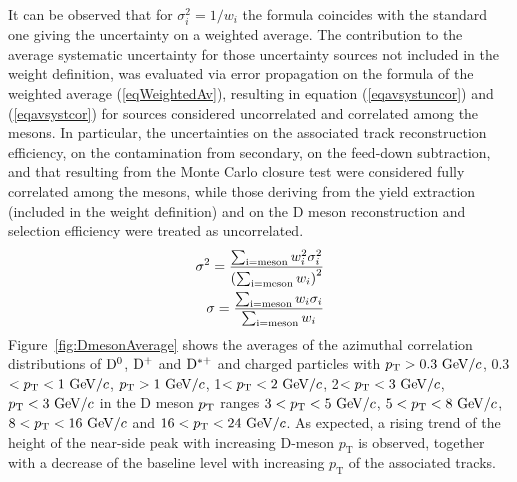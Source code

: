 It can be observed that for $\sigma^{2}_{i}=1/w_{i}$ the formula coincides with the standard one giving the uncertainty on a weighted average.
The contribution to the average systematic uncertainty for those uncertainty sources
not included in the weight definition, was evaluated via error propagation on the formula of
the weighted average (\ref{eqWeightedAv}), resulting in equation (\ref{eqavsystuncor}) and (\ref{eqavsystcor}) for sources
considered uncorrelated and correlated among the mesons. In particular, the uncertainties on the associated track reconstruction efficiency, on the
contamination from secondary, on the feed-down subtraction, and that resulting from the Monte Carlo closure test were considered fully correlated among
the mesons, while those deriving from the yield extraction (included in the weight definition) and on the D meson reconstruction and selection efficiency were treated as uncorrelated.
\begin{eqnarray}
  \sigma^{2}=\frac{\sum_{\rm i=meson}w_{i}^{2}\sigma^{2}_{i}}{\left( \sum_{\rm i=meson}w_{i}\right)^{2}}  \label{eqavsystuncor}\\
  \sigma=\frac{\sum_{\rm i=meson}w_{i}\sigma_{i}}{ \sum_{\rm i=meson}w_{i}}   \label{eqavsystcor}
\end{eqnarray}
Figure~\ref{fig:DmesonAverage} shows the averages of the azimuthal correlation distributions of ${\rm D^0}$, ${\rm D^+}$ and ${\rm D^{*+}}$ and charged particles with $p_{\rm T}>0.3~\mathrm{GeV}/c$, 0.3$<p_{\rm T}<1~\mathrm{GeV}/c$, $p_{\rm T}>1~\mathrm{GeV}/c$, 1$<p_{\rm T}<2~\mathrm{GeV}/c$, 2$<p_{\rm T}<3~\mathrm{GeV}/c$, $p_{\rm T}<3~\mathrm{GeV}/c$ in the D meson $p_{\rm T}$ ranges $3<p_{\rm T}<5~\mathrm{GeV}/c$, $5<p_{\rm T}<8~\mathrm{GeV}/c$, $8<p_{\rm T}<16~\mathrm{GeV}/c$ and $16<p_{\rm T}<24~\mathrm{GeV}/c$.
As expected, a rising trend of the height of the near-side peak with increasing D-meson $p_\mathrm{T}$ is observed, together with a decrease of the baseline level with increasing $p_\mathrm{T}$ of the associated tracks.

